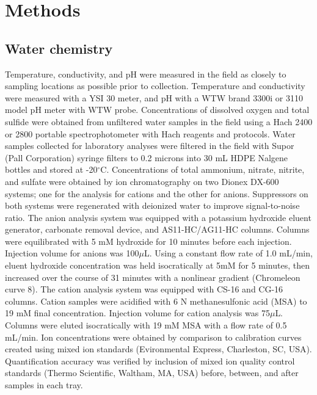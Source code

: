  
 




\section{Methods}
\subsection{Water chemistry} Temperature, conductivity, and pH were measured in the field as closely to sampling locations as possible prior to collection. Temperature and conductivity were measured with a YSI 30 meter, and pH with a WTW brand 3300i or 3110 model pH meter with WTW probe. Concentrations of dissolved oxygen and total sulfide were obtained from unfiltered water samples in the field using a Hach 2400 or 2800 portable spectrophotometer with Hach reagents and protocols. Water samples collected for laboratory analyses were filtered in the field with Supor (Pall Corporation) syringe filters to 0.2 microns into 30 mL HDPE Nalgene bottles and stored at -20$^{\circ}$C. Concentrations of total ammonium, nitrate, nitrite, and sulfate were obtained by ion chromatography on two Dionex DX-600 systems; one for the analysis for cations and the other for anions. Suppressors on both systems were regenerated with deionized water to improve signal-to-noise ratio. The anion analysis system was equipped with a potassium hydroxide eluent generator, carbonate removal device, and AS11-HC/AG11-HC columns. Columns were equilibrated with 5 mM hydroxide for 10 minutes before each injection. Injection volume for anions was 100$\mu$L. Using a constant flow rate of 1.0 mL/min, eluent hydroxide concentration was held isocratically at 5mM for 5 minutes, then increased over the course of 31 minutes with a nonlinear gradient (Chromeleon curve 8). The cation analysis system was equipped with CS-16 and CG-16 columns. Cation samples were acidified with 6 N methanesulfonic acid (MSA) to 19 mM final concentration. Injection volume for cation analysis was 75$\mu$L. Columns were eluted isocratically with 19 mM MSA with a flow rate of 0.5 mL/min. Ion concentrations were obtained by comparison to calibration curves created using mixed ion standards (Evironmental Express, Charleston, SC, USA). Quantification accuracy was verified by inclusion of mixed ion quality control standards (Thermo Scientific, Waltham, MA, USA) before, between, and after samples in each tray.

